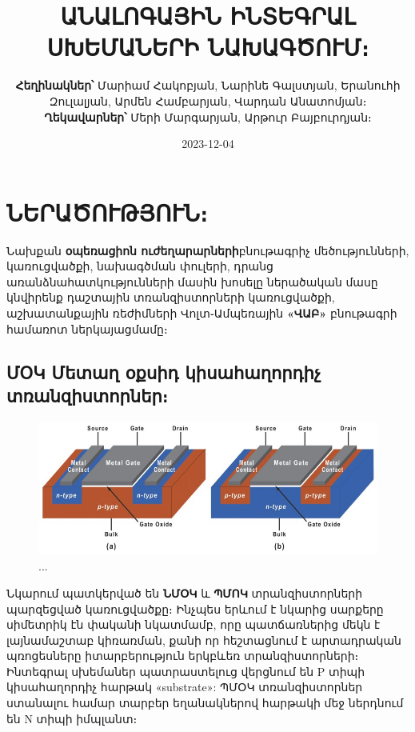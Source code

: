 \documentclass[
]{book}
\title{ԱՆԱԼՈԳԱՅԻՆ ԻՆՏԵԳՐԱԼ ՍԽԵՄԱՆԵՐԻ ՆԱԽԱԳԾՈՒՄ։}
\author{\textbf{Հեղինակներ՝} Մարիամ Հակոբյան, Նարինե Գալստյան, Երանուհի Զուլալյան, Արմեն Համբարյան, Վարդան Անատոմյան։ \textbf{Ղեկավարներ՝} Մերի Մարգարյան, Արթուր Բայբուրդյան։}
\date{2023-12-04}
\theoremstyle{definition}
\theoremstyle{definition}
\theoremstyle{definition}
\theoremstyle{definition}
\theoremstyle{remark}
\begin{document}
\maketitle

{
\setcounter{tocdepth}{1}
\tableofcontents
}
\hypertarget{ux576ux565ux580ux561ux56eux578ux582ux569ux575ux578ux582ux576}{%
\chapter{ՆԵՐԱԾՈՒԹՅՈՒՆ։}\label{ux576ux565ux580ux561ux56eux578ux582ux569ux575ux578ux582ux576}}

Նախքան \textbf{օպեռացիոն ուժեղարարների}բնութագրիչ մեծությունների, կառուցվածքի, նախագծման
փուլերի, դրանց առանձնահատկությունների մասին խոսելը ներածական մասը կնվիրենք դաշտային
տռանզիստորների կառուցվածքի, աշխատանքային ռեժիմների Վոլտ֊Ամպեռային \textbf{«ՎԱԲ»} բնութագրի
համառոտ ներկայացմամը։

\hypertarget{ux574ux585ux56f-ux574ux565ux57fux561ux572-ux585ux584ux57dux56bux564-ux56fux56bux57dux561ux570ux561ux572ux578ux580ux564ux56bux579-ux57fux57cux561ux576ux566ux56bux57dux57fux578ux580ux576ux565ux580}{%
\section{ՄՕԿ Մետաղ օքսիդ կիսահաղորդիչ տռանզիստորներ։}\label{ux574ux585ux56f-ux574ux565ux57fux561ux572-ux585ux584ux57dux56bux564-ux56fux56bux57dux561ux570ux561ux572ux578ux580ux564ux56bux579-ux57fux57cux561ux576ux566ux56bux57dux57fux578ux580ux576ux565ux580}}

\begin{figure}

{\centering \includegraphics[width=1\linewidth]{imige/mostex} 

}

\caption{...}\label{fig:unnamed-chunk-1}
\end{figure}

Նկարում պատկերված են \textbf{ՆՄՕԿ} և \textbf{ՊՄՈԿ} տրանզիստորների պարզեցված կառուցվածքը։ Ինչպես
երևում է նկարից սարքերը սիմետրիկ էն փականի նկատմամբ, որը պատճառներից մեկն է լայնամաշտաբ
կիռառման, քանի որ հեշտացնում է արտադրական պռոցեսները իտարբերություն երկբևեռ
տրանզիստորների։ Ինտեգրալ սխեմաներ պատրաստելուց վերցնում են P տիպի կիսահաղորդիչ հարթակ
«substrate»: ՊՄՕԿ տռանզիստորներ ստանալու համար տարբեր եղանակներով հարթակի մեջ ներդնում
են N տիպի իմպլանտ։
\end{document}
